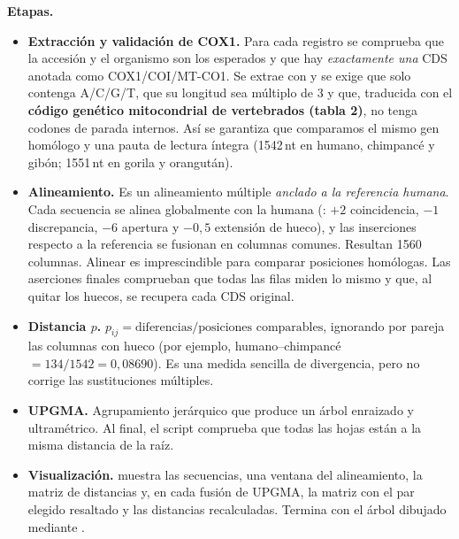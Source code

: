 \documentclass[10pt,a4paper]{article}
\begin{document}
\textbf{Etapas.}
\begin{itemize}
\item \textbf{Extracción y validación de COX1.} Para cada registro se comprueba que la accesión y el organismo son los esperados y que hay \emph{exactamente una} CDS anotada como COX1/COI/MT-CO1. Se extrae con  y se exige que solo contenga A/C/G/T, que su longitud sea múltiplo de 3 y que, traducida con el \textbf{código genético mitocondrial de vertebrados (tabla 2)}, no tenga codones de parada internos. Así se garantiza que comparamos el mismo gen homólogo y una pauta de lectura íntegra (1542\,nt en humano, chimpancé y gibón; 1551\,nt en gorila y orangután).
\item \textbf{Alineamiento.} Es un alineamiento múltiple \emph{anclado a la referencia humana}. Cada secuencia se alinea globalmente con la humana (: $+2$ coincidencia, $-1$ discrepancia, $-6$ apertura y $-0{,}5$ extensión de hueco), y las inserciones respecto a la referencia se fusionan en columnas comunes. Resultan 1560 columnas. Alinear es imprescindible para comparar posiciones homólogas. Las aserciones finales comprueban que todas las filas miden lo mismo y que, al quitar los huecos, se recupera cada CDS original.
\item \textbf{Distancia $p$.} $p_{ij} = \text{diferencias} / \text{posiciones comparables}$, ignorando por pareja las columnas con hueco (por ejemplo, humano--chimpancé $= 134/1542 = 0{,}08690$). Es una medida sencilla de divergencia, pero no corrige las sustituciones múltiples.
\item \textbf{UPGMA.} Agrupamiento jerárquico que produce un árbol enraizado y ultramétrico. Al final, el script comprueba que todas las hojas están a la misma distancia de la raíz.
\item \textbf{Visualización.}  muestra las secuencias, una ventana del alineamiento, la matriz de distancias y, en cada fusión de UPGMA, la matriz con el par elegido resaltado y las distancias recalculadas. Termina con el árbol dibujado mediante .
\end{itemize}
\end{document}

